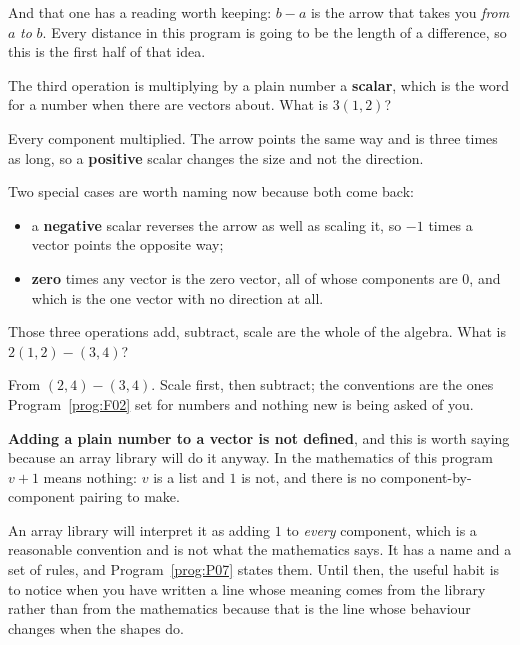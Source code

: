 \begin{fr}
And that one has a reading worth keeping: $b - a$ is the arrow that takes you
\emph{from} $a$ \emph{to} $b$. Every distance in this program is going to be
the length of a difference, so this is the first half of that idea.

The third operation is multiplying by a plain number \dash{} a
\textbf{scalar}, which is the word for a number when there are vectors about.
What is $3(1, 2)$?
\nextframe
\end{fr}

\begin{fr}
Every component multiplied. The arrow points the same way and is three times
as long, so a \textbf{positive} scalar changes the size and not the
direction.

Two special cases are worth naming now because both come back:

\begin{itemize}
\item a \textbf{negative} scalar reverses the arrow as well as scaling it, so
  $-1$ times a vector points the opposite way;
\item \textbf{zero} times any vector is the zero vector, all of whose
  components are $0$, and which is the one vector with no direction at all.
\end{itemize}

Those three operations \dash{} add, subtract, scale \dash{} are the whole of
the algebra. What is $2(1, 2) - (3, 4)$?
\nextframe
\end{fr}

\begin{fr}
From $(2, 4) - (3, 4)$. Scale first, then subtract; the conventions are the
ones Program~\ref{prog:F02} set for numbers and nothing new is being asked of
you.

\begin{trapbox}
\textbf{Adding a plain number to a vector is not defined}, and this is worth
saying because an array library will do it anyway. In the mathematics of this
program $v + 1$ means nothing: $v$ is a list and $1$ is not, and there is no
component-by-component pairing to make.

An array library will interpret it as adding $1$ to \emph{every} component,
which is a reasonable convention and is not what the mathematics says. It has
a name and a set of rules, and Program~\ref{prog:P07} states them. Until then,
the useful habit is to notice when you have written a line whose meaning comes
from the library rather than from the mathematics \dash{} because that is the
line whose behaviour changes when the shapes do.
\end{trapbox}

\end{fr}

